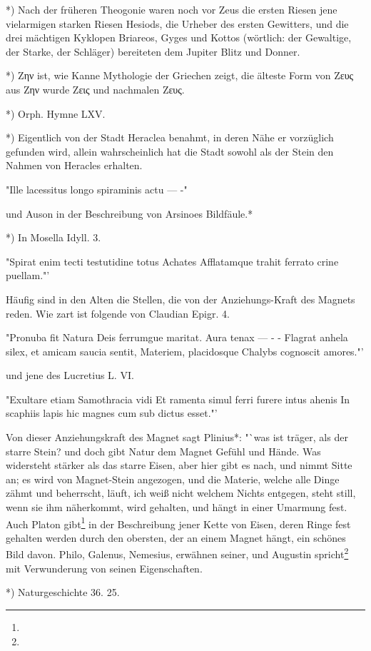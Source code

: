 \documentclass[a4paper, 11pt, oneside, polutonikogreek, german]{article}
\begin{document}
*) Nach der früheren Theogonie waren noch vor Zeus die ersten Riesen jene vielarmigen starken Riesen Hesiods, die Urheber des ersten Gewitters, und die drei mächtigen Kyklopen Briareos, Gyges und Kottos (wörtlich: der Gewaltige, der Starke, der Schläger) bereiteten dem Jupiter Blitz und Donner.

*) Ζην ist, wie Kanne Mythologie der Griechen zeigt, die älteste Form von Ζευς aus Ζην wurde Ζεις und nachmalen Ζευς.

*) Orph. Hymne LXV.

*) Eigentlich von der Stadt Heraclea benahmt, in deren Nähe er vorzüglich gefunden wird, allein wahrscheinlich hat die Stadt sowohl als der Stein den Nahmen von Heracles erhalten.

"Ille lacessitus longo spiraminis actu --- -"

und Auson in der Beschreibung von Arsinoes Bildfäule.*

*) In Mosella Idyll. 3.

"Spirat enim tecti testutidine totus Achates
Afflatamque trahit ferrato crine puellam."'

Häufig sind in den Alten die Stellen, die von der Anziehungs-Kraft des Magnets reden. Wie zart ist folgende von Claudian Epigr. 4.

"Pronuba fit Natura Deis ferrumgue maritat.
Aura tenax --- - -
Flagrat anhela silex, et amicam saucia sentit,
Materiem, placidosque Chalybs cognoscit
amores."'

und jene des Lucretius L. VI.

"Exultare etiam Samothracia vidi
Et ramenta simul ferri furere intus ahenis
In scaphiis lapis hic magnes cum sub dictus
esset."'

Von dieser Anziehungskraft des Magnet sagt Plinius*: "`was ist träger, als der starre Stein? und doch gibt Natur dem Magnet Gefühl und Hände. Was widersteht stärker als das starre Eisen, aber hier gibt es nach, und nimmt Sitte an; es wird von Magnet-Stein angezogen, und die Materie, welche alle Dinge zähmt und beherrscht, läuft, ich weiß nicht welchem Nichts entgegen, steht still, wenn sie ihm näherkommt, wird gehalten, und hängt in einer Umarmung fest. Auch Platon gibt\footnote{} in der Beschreibung jener Kette von Eisen, deren Ringe fest gehalten werden durch den obersten, der an einem Magnet hängt, ein schönes Bild davon. Philo, Galenus, Nemesius, erwähnen seiner, und Augustin spricht\footnote{} mit Verwunderung von seinen Eigenschaften.

*) Naturgeschichte 36. 25.
\end{document}
